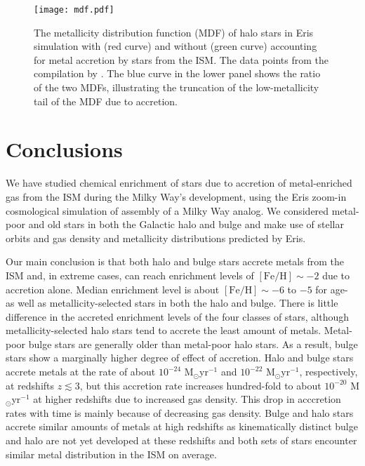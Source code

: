 \documentclass[a4paper,fleqn,usenatbib]{mnras}
\begin{document}
\begin{figure}
  \texttt{[image: mdf.pdf]}
  \caption{The metallicity distribution function (MDF) of halo stars
    in Eris simulation with (red curve) and without (green curve)
    accounting for metal accretion by stars from the ISM.  The data
    points from the compilation by \citet{2016arXiv161005777D}.  The
    blue curve in the lower panel shows the ratio of the two MDFs,
    illustrating the truncation of the low-metallicity tail of the
    MDF due to accretion.}
\label{fig:mdf_corrected}
\end{figure}

\section{Conclusions}
\label{sec:conc}

We have studied chemical enrichment of stars due to accretion of
metal-enriched gas from the ISM during the Milky Way's development,
using the Eris zoom-in cosmological simulation of assembly of a Milky
Way analog.  We considered metal-poor and old stars in both the
Galactic halo and bulge and make use of stellar orbits and gas density
and metallicity distributions predicted by Eris.

Our main conclusion is that both halo and bulge stars accrete metals
from the ISM and, in extreme cases, can reach enrichment levels of
$[\mathrm{Fe}/\mathrm{H}]\sim -2$ due to accretion alone.  Median
enrichment level is about $[\mathrm{Fe}/\mathrm{H}] \sim -6$ to $-5$
for age- as well as metallicity-selected stars in both the halo and
bulge.  There is little difference in the accreted enrichment levels
of the four classes of stars, although metallicity-selected halo stars
tend to accrete the least amount of metals.  Metal-poor bulge stars
are generally older than metal-poor halo stars.  As a result, bulge
stars show a marginally higher degree of effect of accretion.  Halo
and bulge stars accrete metals at the rate of about $10^{-24}$
M$_\odot$yr$^{-1}$ and $10^{-22}$ M$_\odot$yr$^{-1}$, respectively, at
redshifts $z\lesssim 3$, but this accretion rate increases
hundred-fold to about $10^{-20}$ M$_\odot$yr$^{-1}$ at higher
redshifts due to increased gas density.  This drop in acccretion rates
with time is mainly because of decreasing gas density.  Bulge and halo
stars accrete similar amounts of metals at high redshifts as
kinematically distinct bulge and halo are not yet developed at these
redshifts and both sets of stars encounter similar metal distribution
in the ISM on average.
\end{document}
